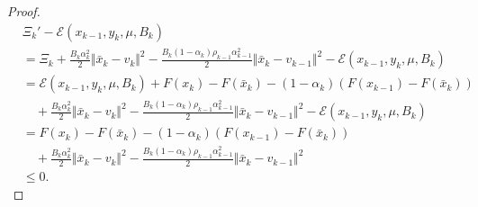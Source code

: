 \documentclass[12pt]{article}
\begin{document}
\begin{proof}
            \begin{align*}
                & \Xi_k' - \mathcal E(x_{k - 1}, y_k, \mu, B_k) 
                \\
                &= 
                \Xi_k 
                + \frac{B_k\alpha_k^2}{2}\Vert \bar x_k - v_k\Vert^2 
                - \frac{B_k(1 - \alpha_k)\rho_{k - 1}\alpha_{k - 1}^2}{2}\Vert \bar x_k - v_{k - 1}\Vert^2
                - \mathcal E(x_{k - 1}, y_k, \mu, B_k) 
                \\
                &= \mathcal E(x_{k - 1}, y_k, \mu, B_k)
                + F(x_k) - F(\bar x_k)
                - (1 - \alpha_k)(F(x_{k - 1}) - F(\bar x_k))
                    \\ &\quad 
                    + \frac{B_k\alpha_k^2}{2}\Vert \bar x_k - v_k\Vert^2 
                    - \frac{B_k(1 - \alpha_k)\rho_{k - 1}\alpha_{k - 1}^2}{2}\Vert \bar x_k - v_{k - 1}\Vert^2
                    - \mathcal E(x_{k - 1}, y_k, \mu, B_k)
                \\
                &=  
                F(x_k) - F(\bar x_k)
                - (1 - \alpha_k)(F(x_{k - 1}) - F(\bar x_k))
                    \\ &\quad 
                    + \frac{B_k\alpha_k^2}{2}\Vert \bar x_k - v_k\Vert^2 
                    - \frac{B_k(1 - \alpha_k)\rho_{k - 1}\alpha_{k - 1}^2}{2}\Vert \bar x_k - v_{k - 1}\Vert^2
                \\
                &\le 0. 
            \end{align*}
        \end{proof}
\end{document}
